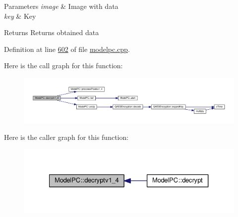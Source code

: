 \begin{DoxyParams}{Parameters}
{\em image} & Image with data \\
\hline
{\em key} & Key \\
\hline
\end{DoxyParams}
\begin{DoxyReturn}{Returns}
Returns obtained data 
\end{DoxyReturn}


Definition at line \hyperlink{modelpc_8cpp_source_l00602}{602} of file \hyperlink{modelpc_8cpp_source}{modelpc.\+cpp}.



Here is the call graph for this function\+:
\nopagebreak
\begin{figure}[H]
\begin{center}
\leavevmode
\includegraphics[width=350pt]{class_model_p_c_a7a1f7d491e1bde16936190b9e90896b0_cgraph}
\end{center}
\end{figure}




Here is the caller graph for this function\+:
\nopagebreak
\begin{figure}[H]
\begin{center}
\leavevmode
\includegraphics[width=327pt]{class_model_p_c_a7a1f7d491e1bde16936190b9e90896b0_icgraph}
\end{center}
\end{figure}


